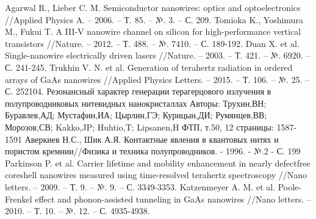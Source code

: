 \documentclass[a4paper,14pt,russian]{extreport}
\begin{document}
	\begin{thebibliography}{9}
		 Agarwal R., Lieber C. M. Semiconductor nanowires: optics and optoelectronics //Applied Physics A. – 2006. – Т. 85. – №. 3. – С. 209.
		 Tomioka K., Yoshimura M., Fukui T. A III-V nanowire channel on silicon for high-performance vertical transistors //Nature. – 2012. – Т. 488. – №. 7410. – С. 189-192.
		 Duan X. et al. Single-nanowire electrically driven lasers //Nature. – 2003. – Т. 421. – №. 6920. – С. 241-245.
		 Trukhin V. N. et al. Generation of terahertz radiation in ordered arrays of GaAs nanowires //Applied Physics Letters. – 2015. – Т. 106. – №. 25. – С. 252104.
		 Резонансный характер генерации терагерцового излучения в полупроводниковых нитевидных нанокристаллах Авторы: Трухин,ВН; Буравлев,АД; Мустафин,ИА; Цырлин,ГЭ; Курицын,ДИ; Румянцев,ВВ; Морозов,СВ; Kakko,JP; Huhtio,T; Lipsanen,H ФТП, т.50, 12 страницы: 1587-1591 
		 Аверкиев Н.С., Шик А.Я.  Контактные явления в квантовых нитях и пористом кремнии//Физика и техника полупроводников. - 1996. - №.2 - С. 199
		 Parkinson P. et al. Carrier lifetime and mobility enhancement in nearly defectfree coreshell nanowires measured using time-resolved terahertz spectroscopy //Nano letters. – 2009. – Т. 9. – №. 9. – С. 3349-3353.
		 Katzenmeyer A. M. et al. Poole-Frenkel effect and phonon-assisted tunneling in GaAs nanowires //Nano letters. – 2010. – Т. 10. – №. 12. – С. 4935-4938.
	\end{thebibliography}		
\end{document}
